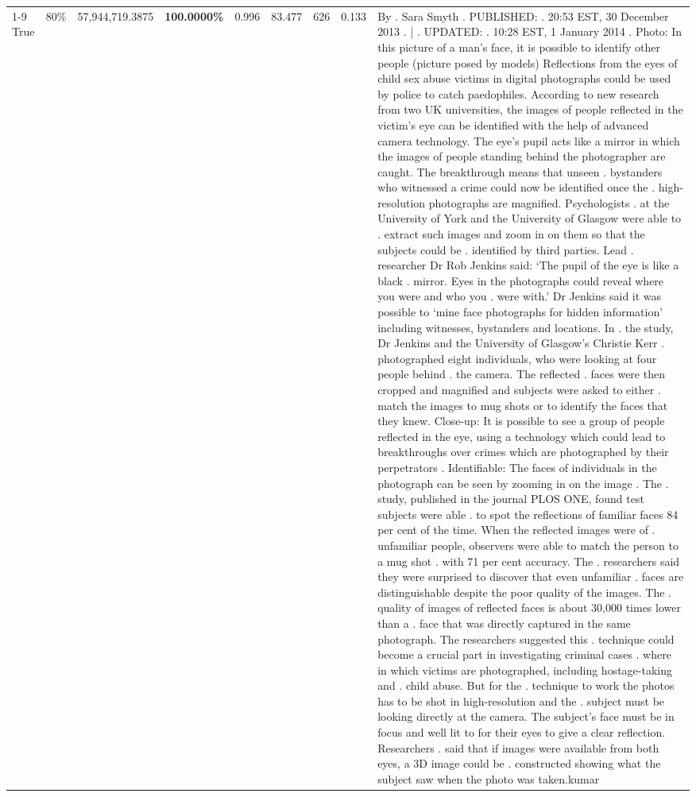 \begin{table}[H]
\begin{tabular}{lllrlllll}
\cline{1-9} \cline{2-9}
True & 80\% & 57,944,719.3875 & \bfseries \color{red} 100.0000\% & 0.996 & 83.477 & 626 & 0.133 & By . Sara Smyth . PUBLISHED: . 20:53 EST, 30 December 2013 . | . UPDATED: . 10:28 EST, 1 January 2014 . Photo: In this picture of a man's face, it is possible to identify other people (picture posed by models) Reflections from the eyes of child sex abuse victims in digital photographs could be used by police to catch paedophiles. According to new research from two UK universities, the images of people reflected in the victim's eye can be identified with the help of advanced camera technology. The eye's pupil acts like a mirror in which the images of people standing behind the photographer are caught. The breakthrough means that unseen . bystanders who witnessed a crime could now be identified once the . high-resolution photographs are magnified. Psychologists . at the University of York and the University of Glasgow were able to . extract such images and zoom in on them so that the subjects could be . identified by third parties. Lead . researcher Dr Rob Jenkins said: ‘The pupil of the eye is like a black . mirror. Eyes in the photographs could reveal where you were and who you . were with.' Dr Jenkins said it was possible to ‘mine face photographs for hidden information' including witnesses, bystanders and locations. In . the study, Dr Jenkins and the University of Glasgow's Christie Kerr . photographed eight individuals, who were looking at four people behind . the camera. The reflected . faces were then cropped and magnified and subjects were asked to either . match the images to mug shots or to identify the faces that they knew. Close-up: It is possible to see a group of people reflected in the eye, using a technology which could lead to breakthroughs over crimes which are photographed by their perpetrators . Identifiable: The faces of individuals in the photograph can be seen by zooming in on the image . The . study, published in the journal PLOS ONE, found test subjects were able . to spot the reflections of familiar faces 84 per cent of the time. When the reflected images were of . unfamiliar people, observers were able to match the person to a mug shot . with 71 per cent accuracy. The . researchers said they were surprised to discover that even unfamiliar . faces are distinguishable despite the poor quality of the images. The . quality of images of reflected faces is about 30,000 times lower than a . face that was directly captured in the same photograph. The researchers suggested this . technique could become a crucial part in investigating criminal cases . where in which victims are photographed, including hostage-taking and . child abuse. But for the . technique to work the photos has to be shot in high-resolution and the . subject must be looking directly at the camera. The subject's face must be in focus and well lit to for their eyes to give a clear reflection. Researchers . said that if images were available from both eyes, a 3D image could be . constructed showing what the subject saw when the photo was taken.kumar \\

\end{tabular}
\end{table}
